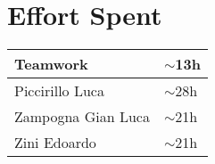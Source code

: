 \section{Effort Spent}
\begin{tabular}{| p{5cm} | p{5cm} |}
\hline
Teamwork & $\sim$13h\\
\hline
Piccirillo Luca & $\sim$28h\\
\hline
Zampogna Gian Luca & $\sim$21h\\
\hline
Zini Edoardo & $\sim$21h\\
\hline
\end{tabular}
